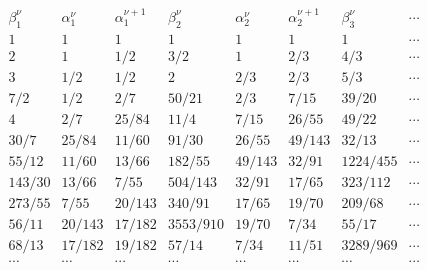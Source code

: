 $$%
\begin{array}{ccccccccccccccccccccccccccccccccccccccccccccccc}
\beta_1^{\nu} & \alpha_1^{\nu} & \alpha_1^{\nu+1} & \beta_2^{\nu} & \alpha_2^{\nu} & \alpha_2^{\nu+1} & \beta_3^{\nu} & \cdots \\
 1 & 1 & 1 & 1 & 1 & 1 & 1 & \cdots \\
 2 & 1 & 1/2 & 3/2 & 1 & 2/3 & 4/3  & \cdots \\
 3 & 1/2 & 1/2 & 2 & 2/3 & 2/3 & 5/3  & \cdots \\
 7/2 & 1/2 & 2/7 & 50/21 & 2/3 & 7/15 & 39/20  & \cdots \\
 4 & 2/7 & 25/84 & 11/4 & 7/15 & 26/55 & 49/22  & \cdots \\
 30/7 & 25/84 & 11/60 & 91/30 & 26/55 & 49/143 & 32/13  & \cdots \\
 55/12 & 11/60 & 13/66 & 182/55 & 49/143 & 32/91 & 1224/455  & \cdots \\
 143/30 & 13/66 & 7/55 & 504/143 & 32/91 & 17/65 & 323/112  & \cdots \\
 273/55 & 7/55 & 20/143 & 340/91 & 17/65 & 19/70 & 209/68  & \cdots \\
 56/11 & 20/143 & 17/182 & 3553/910 & 19/70 & 7/34 & 55/17  & \cdots \\
 68/13 & 17/182 & 19/182 & 57/14 & 7/34 & 11/51 & 3289/969  &
\cdots \\
\cdots & \cdots & \cdots & \cdots & \cdots & \cdots & \cdots &
\cdots \\
\end{array}
$$%
